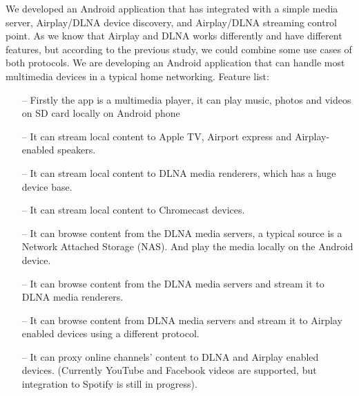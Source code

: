 
We developed an Android application that has integrated with a simple media server, Airplay/DLNA device discovery, and Airplay/DLNA streaming control point.
As we know that Airplay and DLNA works differently and have different features, but according to the previous study, we could combine some use cases of both protocols. We are developing an Android application that can handle most multimedia devices in a typical home networking. Feature list:
\begin{itemize}
\item[--]Firstly the app is a multimedia player, it can play music, photos and videos on SD card locally on Android phone
\item[--]It can stream local content to Apple TV, Airport express and Airplay-enabled speakers.
\item[--]It can stream local content to DLNA media renderers, which has a huge device base.
\item[--]It can stream local content to Chromecast devices.
\item[--]It can browse content from the DLNA media servers, a typical source is a Network Attached Storage (NAS). And play the media locally on the Android device.
\item[--]It can browse content from the DLNA media servers and stream it to DLNA media renderers.
\item[--]It can browse content from DLNA media servers and stream it to Airplay enabled devices using a different protocol.
\item[--]It can proxy online channels' content to DLNA and Airplay enabled devices. (Currently YouTube and Facebook videos are supported, but integration to Spotify is still in progress).
\end{itemize}